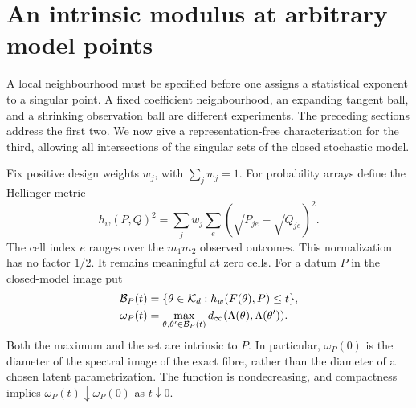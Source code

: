 \section{An intrinsic modulus at arbitrary model points}
\label{sec:intrinsic-modulus}
A local neighbourhood must be specified before one assigns a statistical
exponent to a singular point. A fixed coefficient neighbourhood, an
expanding tangent ball, and a shrinking observation ball are different
experiments. The preceding sections address the first two. We now give
a representation-free characterization for the third, allowing all
intersections of the singular sets of the closed stochastic model.

Fix positive design weights $w_j$, with $\sum_jw_j=1$. For probability
arrays define the Hellinger metric
\[
 h_w(P,Q)^2=\sum_jw_j\sum_e(\sqrt{P_{je}}-\sqrt{Q_{je}})^2.
\]
The cell index $e$ ranges over the $m_1m_2$ observed outcomes. This
normalization has no factor $1/2$. It remains meaningful at zero cells.
For a datum $P$ in the closed-model image put
\begin{align}
 \mathcal B_P(t)&=\{\theta\in\mathcal K_d:h_w(F(\theta),P)\le t\},\nonumber\\
 \omega_P(t)&=\max_{\theta,\theta'\in\mathcal B_P(t)}
                   d_\infty(\Lambda(\theta),\Lambda(\theta')).
                                                  \label{eq:intrinsic-modulus}
\end{align}
Both the maximum and the set are intrinsic to $P$. In particular,
\(\omega_P(0)\) is the diameter of the spectral image of the exact
fibre, rather than the diameter of a chosen latent parametrization.
The function is nondecreasing, and compactness implies
$\omega_P(t)\downarrow\omega_P(0)$ as $t\downarrow0$.

